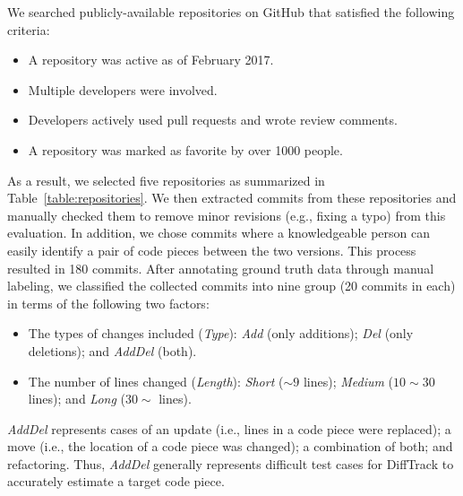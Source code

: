
We searched publicly-available repositories on GitHub that satisfied the following criteria:

\begin{itemize}
\setlength{\itemsep}{0cm}
\item A repository was active as of February 2017.
\item Multiple developers were involved.
\item Developers actively used pull requests and wrote review comments.
\item A repository was marked as favorite by over 1000 people.
\end{itemize}

As a result, we selected five repositories as summarized in Table~\ref{table:repositories}.
We then extracted commits from these repositories and manually checked them to remove minor revisions (e.g., fixing a typo) from this evaluation.
In addition, we chose commits where a knowledgeable person can easily identify a pair of code pieces between the two versions.
This process resulted in 180 commits.
After annotating ground truth data through manual labeling, we classified the collected commits into nine group (20 commits in each) in terms of the following two factors:

\begin{itemize}
\setlength{\itemsep}{0cm}
\item The types of changes included (\textit{Type}): \textit{Add} (only additions); \textit{Del} (only deletions); and \textit{AddDel} (both).
\item The number of lines changed (\textit{Length}): \textit{Short} ($\sim 9$ lines); \textit{Medium} ($10 \sim 30$ lines); and \textit{Long} ($30 \sim$ lines).
\end{itemize}

\textit{AddDel} represents cases of an update (i.e., lines in a code piece were replaced); a move (i.e., the location of a code piece was changed); a combination of both; and refactoring.
Thus, \textit{AddDel} generally represents difficult test cases for DiffTrack to accurately estimate a target code piece. 


